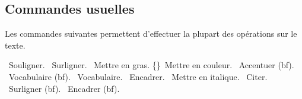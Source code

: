 \subsection{Commandes usuelles}

\begin{Methode}
    Les commandes suivantes permettent d'effectuer la plupart des opérations sur le texte. 
    \begin{tcbenumerate}[2]
        \tcbitem  {}\ Souligner.
        \tcbitem  {}\ Surligner.
        \tcbitem  {}\ Mettre en gras.
        \tcbitem  \{\}\ Mettre en couleur.
        \tcbitem  {}\ Accentuer (bf).
        \tcbitem  {}\ Vocabulaire (bf).
        \tcbitem  {}\ Vocabulaire.
        \tcbitem  {}\ Encadrer.
        \tcbitem  {}\ Mettre en italique.
        \tcbitem  {}\ Citer.
        \tcbitem  {}\ Surligner (bf).
        \tcbitem  {}\ Encadrer (bf).
    \end{tcbenumerate}
\end{Methode}


